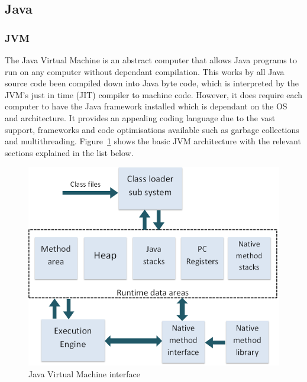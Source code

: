 \documentclass[final_report.tex]{subfiles}
\begin{document}

\subsection{Java}

\subsubsection{JVM}

The Java Virtual Machine is an abstract computer that allows Java programs to run on any computer without dependant compilation. This works by all Java source code been compiled down into Java byte code, which is interpreted by the JVM's just in time (JIT) compiler to machine code. However, it does require each computer to have the Java framework installed which is dependant on the OS and architecture. It provides an appealing coding language due to the vast support, frameworks and code optimisations available such as garbage collections and multithreading. Figure~\ref{fig:jvm} shows the basic JVM architecture with the relevant sections explained in the list below.

\begin{figure}[H]
	\centering
	\includegraphics[width=\textwidth]{img/jvm.png}
	\caption{Java Virtual Machine interface \cite{jvm}}
	\label{fig:jvm}
\end{figure}
\end{document}
